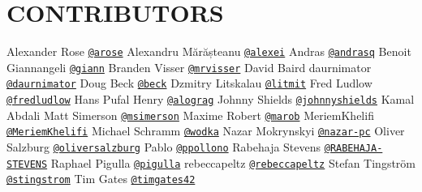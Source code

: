 \chapter{CONTRIBUTORS }
\hypertarget{md_gui_2node__modules_2sprintf-js_2CONTRIBUTORS}{}\label{md_gui_2node__modules_2sprintf-js_2CONTRIBUTORS}
Alexander Rose \href{https://github.com/arose}{\texttt{@arose}} Alexandru Mărășteanu \href{https://github.com/alexei}{\texttt{@alexei}} Andras \href{https://github.com/andrasq}{\texttt{@andrasq}} Benoit Giannangeli \href{https://github.com/giann}{\texttt{@giann}} Branden Visser \href{https://github.com/mrvisser}{\texttt{@mrvisser}} David Baird daurnimator \href{https://github.com/daurnimator}{\texttt{@daurnimator}} Doug Beck \href{https://github.com/beck}{\texttt{@beck}} Dzmitry Litskalau \href{https://github.com/litmit}{\texttt{@litmit}} Fred Ludlow \href{https://github.com/fredludlow}{\texttt{@fredludlow}} Hans Pufal Henry \href{https://github.com/alograg}{\texttt{@alograg}} Johnny Shields \href{https://github.com/johnnyshields}{\texttt{@johnnyshields}} Kamal Abdali Matt Simerson \href{https://github.com/msimerson}{\texttt{@msimerson}} Maxime Robert \href{https://github.com/marob}{\texttt{@marob}} Meriem\+Khelifi \href{https://github.com/MeriemKhelifi}{\texttt{@\+Meriem\+Khelifi}} Michael Schramm \href{https://github.com/wodka}{\texttt{@wodka}} Nazar Mokrynskyi \href{https://github.com/nazar-pc}{\texttt{@nazar-\/pc}} Oliver Salzburg \href{https://github.com/oliversalzburg}{\texttt{@oliversalzburg}} Pablo \href{https://github.com/ppollono}{\texttt{@ppollono}} Rabehaja Stevens \href{https://github.com/RABEHAJA-STEVENS}{\texttt{@\+RABEHAJA-\/STEVENS}} Raphael Pigulla \href{https://github.com/pigulla}{\texttt{@pigulla}} rebeccapeltz \href{https://github.com/rebeccapeltz}{\texttt{@rebeccapeltz}} Stefan Tingström \href{https://github.com/stingstrom}{\texttt{@stingstrom}} Tim Gates \href{https://github.com/timgates42}{\texttt{@timgates42}} 